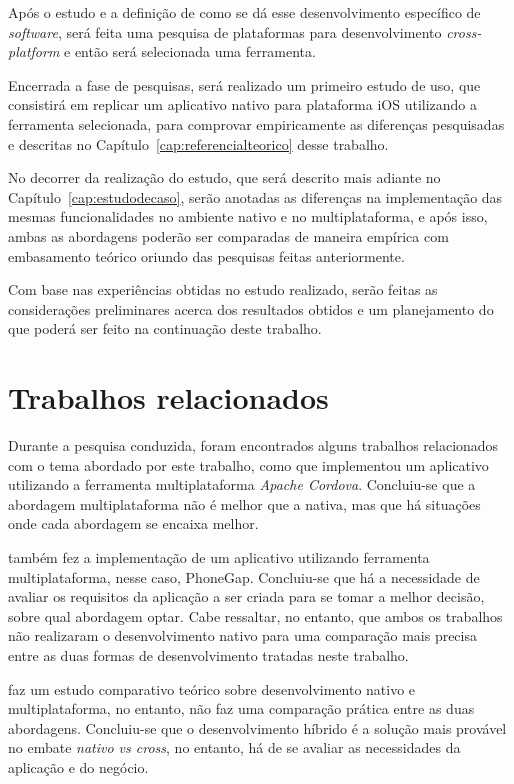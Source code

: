 Após o estudo e a definição de como se dá esse desenvolvimento específico de \textit{software},
será feita uma pesquisa de plataformas para desenvolvimento \textit{cross-platform} e então será selecionada uma ferramenta. 

Encerrada a fase de pesquisas, será realizado um primeiro estudo de uso, que consistirá em replicar um aplicativo nativo para plataforma iOS utilizando a ferramenta selecionada, 
para comprovar empiricamente as diferenças pesquisadas e descritas no Capítulo~\ref{cap:referencialteorico} desse trabalho.

No decorrer da realização do estudo, que será descrito mais adiante no 
Capítulo~\ref{cap:estudodecaso}, serão anotadas as diferenças na implementação das mesmas funcionalidades no ambiente nativo e no multiplataforma, e após isso, ambas as abordagens poderão ser comparadas
de maneira empírica com embasamento teórico oriundo das pesquisas feitas anteriormente.

Com base nas experiências obtidas no estudo realizado, serão feitas as considerações preliminares acerca dos resultados obtidos e um planejamento do que poderá ser feito na continuação deste trabalho.

\section{Trabalhos relacionados} \label{sec:trabalhosrelacionados}

Durante a pesquisa conduzida, foram encontrados alguns trabalhos relacionados com o tema abordado por este trabalho, como 
que implementou um aplicativo utilizando a ferramenta multiplataforma \textit{Apache Cordova}. Concluiu-se que a abordagem multiplataforma
não é melhor que a nativa, mas que há situações onde cada abordagem se encaixa melhor.

 também fez a implementação de um aplicativo utilizando ferramenta multiplataforma, nesse caso, PhoneGap. 
Concluiu-se que há a necessidade de avaliar os requisitos da aplicação a ser criada para se tomar a melhor decisão, sobre qual abordagem optar.
Cabe ressaltar, no entanto, que ambos os trabalhos não realizaram o desenvolvimento nativo para uma comparação mais precisa entre as duas formas de desenvolvimento
tratadas neste trabalho. 

 faz um estudo comparativo teórico sobre desenvolvimento nativo e multiplataforma, no entanto,
não faz uma comparação prática entre as duas abordagens. Concluiu-se que o desenvolvimento híbrido é a solução mais provável no embate 
\textit{nativo vs cross}, no entanto, há de se avaliar as necessidades da aplicação e do negócio.

